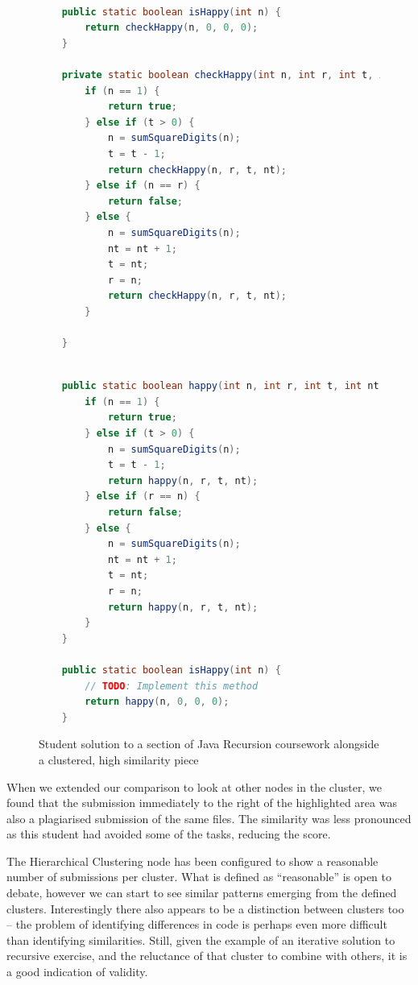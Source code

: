 \begin{figure}[H]
\begin{minipage}[b]{0.45\linewidth}
\begin{lstlisting}[language=Java]

	public static boolean isHappy(int n) {
		return checkHappy(n, 0, 0, 0);
	}

	private static boolean checkHappy(int n, int r, int t, int nt) {
		if (n == 1) {
			return true;
		} else if (t > 0) {
			n = sumSquareDigits(n);
			t = t - 1;
			return checkHappy(n, r, t, nt);
		} else if (n == r) {
			return false;
		} else {
			n = sumSquareDigits(n);
			nt = nt + 1;
			t = nt;
			r = n;
			return checkHappy(n, r, t, nt);
		}

	}
\end{lstlisting}
\end{minipage}
\hspace{0.5cm}
\begin{minipage}[b]{0.45\linewidth}
\begin{lstlisting}[language=Java]

	public static boolean happy(int n, int r, int t, int nt) {
		if (n == 1) {
			return true;
		} else if (t > 0) {
			n = sumSquareDigits(n);
			t = t - 1;
			return happy(n, r, t, nt);
		} else if (r == n) {
			return false;
		} else {
			n = sumSquareDigits(n);
			nt = nt + 1;
			t = nt;
			r = n;
			return happy(n, r, t, nt);
		}
	}

	public static boolean isHappy(int n) {
		// TODO: Implement this method
		return happy(n, 0, 0, 0);
	}

\end{lstlisting}
\end{minipage}
\caption{Student solution to a section of Java Recursion coursework alongside
a clustered, high similarity piece}
\label{code:recursionPlag}
\end{figure}

When we extended our comparison to look at other nodes in the cluster, we found
that the submission immediately to the right of the highlighted area was also
a plagiarised submission of the same files. The similarity was less pronounced
as this student had avoided some of the tasks, reducing the score.

The Hierarchical Clustering node has been configured to show a reasonable number
of submissions per cluster. What is defined as ``reasonable'' is open to debate,
however we can start to see similar patterns emerging from the defined clusters.
Interestingly there also appears to be a distinction between clusters too --
the problem of identifying differences in code is perhaps even more difficult
than identifying similarities. Still, given the example of an iterative solution
to recursive exercise, and the reluctance of that cluster to combine with others,
it is a good indication of validity.

